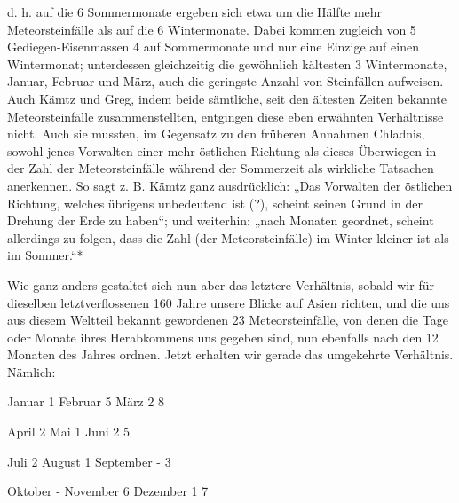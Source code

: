 \documentclass[a4paper, 11pt, oneside, polutonikogreek, german]{article}
\begin{document}
d. h. auf die 6 Sommermonate ergeben sich etwa um die Hälfte mehr Meteorsteinfälle als auf die 6 Wintermonate. Dabei kommen zugleich von 5 Gediegen-Eisenmassen 4 auf Sommermonate und nur eine Einzige auf einen Wintermonat; unterdessen gleichzeitig die gewöhnlich kältesten 3 Wintermonate, Januar, Februar und März, auch die geringste Anzahl von Steinfällen aufweisen. Auch Kämtz und Greg, indem beide sämtliche, seit den ältesten Zeiten bekannte Meteorsteinfälle zusammenstellten, entgingen diese eben erwähnten Verhältnisse nicht. Auch sie mussten, im Gegensatz zu den früheren Annahmen Chladnis, sowohl jenes Vorwalten einer mehr östlichen Richtung als dieses Überwiegen in der Zahl der Meteorsteinfälle während der Sommerzeit als wirkliche Tatsachen anerkennen. So sagt z. B. Kämtz ganz ausdrücklich: „Das Vorwalten der östlichen Richtung, welches übrigens unbedeutend ist (?), scheint seinen Grund in der Drehung der Erde zu haben“; und weiterhin: „nach Monaten geordnet, scheint allerdings zu folgen, dass die Zahl (der Meteorsteinfälle) im Winter kleiner ist als im Sommer.“*

Wie ganz anders gestaltet sich nun aber das letztere Verhältnis, sobald wir für dieselben letztverflossenen 160 Jahre unsere Blicke auf Asien richten, und die uns aus diesem Weltteil bekannt gewordenen 23 Meteorsteinfälle, von denen die Tage oder Monate ihres Herabkommens uns gegeben sind, nun ebenfalls nach den 12 Monaten des Jahres ordnen. Jetzt erhalten wir gerade das umgekehrte Verhältnis. Nämlich:

Januar 1  
Februar 5  
März 2  
8  

April 2  
Mai 1  
Juni 2  
5

Juli 2  
August 1  
September -  
3

Oktober -  
November 6  
Dezember 1  
7
\end{document}
